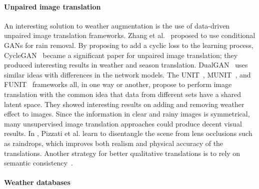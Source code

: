 \paragraph{Unpaired image translation} An interesting solution to weather augmentation is the use of data-driven unpaired image translation frameworks. Zhang et al.~\cite{zhang2019image} proposed to use conditional GANs for rain removal. By proposing to add a cyclic loss to the learning process, CycleGAN~\cite{zhu2017unpaired} became a significant paper for unpaired image translation; they produced interesting results in weather and season translation. DualGAN~\cite{yi2017dualgan} uses similar ideas with differences in the network models. The UNIT~\cite{liu2017unsupervised}, MUNIT~\cite{huang2018multimodal}, and FUNIT~\cite{liu2019few} frameworks all, in one way or another, propose to perform image translation with the common idea that data from different sets have a shared latent space. They showed interesting results on adding and removing weather effect to images. 
Since the information in clear and rainy images is symmetrical, many unsupervised image translation approaches could produce decent visual results. 
In \cite{pizzati2020model}, Pizzati et al. learn to disentangle the scene from lens occlusions such as raindrops, which improves both realism and physical accuracy of the translations.
Another strategy for better qualitative translations is to rely on semantic consistency~\cite{li2018semantic,tasar2020semi2i}. 

\paragraph{Weather databases}

